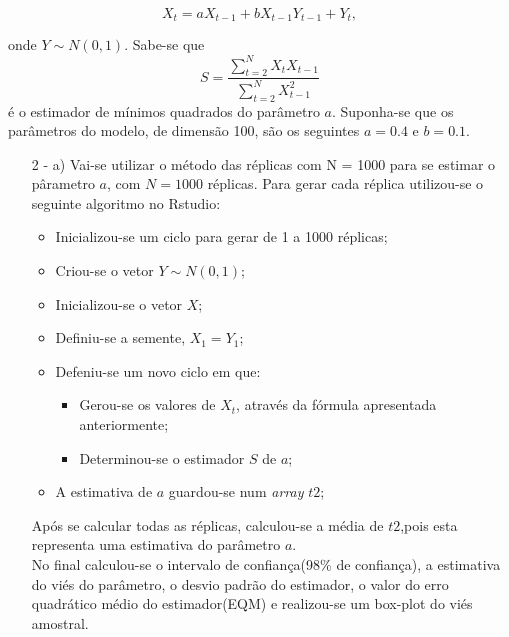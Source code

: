 \documentclass[letterpaper,11pt]{article}
\begin{document}
$$X_t = aX_{t-1} + bX_{t-1}Y_{t-1} + Y_t,$$ 

onde $Y \sim N(0,1)$. Sabe-se que $$S=\frac{\sum_{t=2}^{N}X_tX_{t-1}}{\sum_{t=2}^{N}X_{t-1}^{2}}$$
é o estimador de mínimos quadrados do parâmetro $a$. Suponha-se que os parâmetros do modelo, de dimensão 100, são os seguintes $a=0.4$ e $b=0.1$. 
\begin{enumerate}
\item[2 - a)] Vai-se utilizar o método das réplicas com N = 1000 para se estimar o pârametro $a$, com $N=1000$ réplicas. Para gerar cada réplica utilizou-se o seguinte algoritmo no Rstudio: 
\begin{itemize}
\item Inicializou-se um ciclo para gerar de 1 a 1000 réplicas;
\item Criou-se o vetor $Y \sim N(0,1)$;
\item Inicializou-se o vetor $X$;
\item Definiu-se a semente, $X_1 = Y_1$;
\item Defeniu-se um novo ciclo em que: 
\begin{itemize}
\item Gerou-se os valores de $X_t$, através da fórmula apresentada anteriormente;
\item Determinou-se o estimador $S$ de $a$;
\end{itemize}
\item A estimativa de $a$ guardou-se num \textit{array} $t2$;
\end{itemize} 
Após se calcular todas as réplicas, calculou-se a média de $t2$,pois esta representa uma estimativa do parâmetro $a$.\\ 
No final calculou-se o intervalo de confiança(98\% de confiança), a estimativa do viés do parâmetro, o desvio padrão do estimador, o valor do erro quadrático médio do estimador(EQM) e realizou-se um box-plot do viés amostral.


\end{enumerate}
\end{document}

